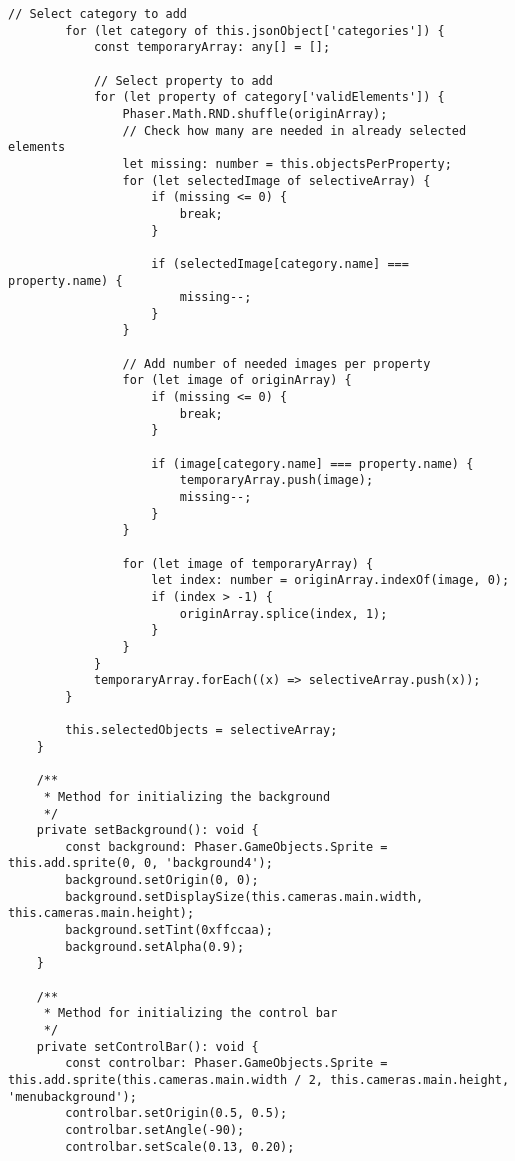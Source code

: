 \begin{lstlisting}[style=TypeScript, caption={sortingScene.ts}]
        // Select category to add
        for (let category of this.jsonObject['categories']) {
            const temporaryArray: any[] = [];

            // Select property to add
            for (let property of category['validElements']) {
                Phaser.Math.RND.shuffle(originArray);
                // Check how many are needed in already selected elements
                let missing: number = this.objectsPerProperty;
                for (let selectedImage of selectiveArray) {
                    if (missing <= 0) {
                        break;
                    }

                    if (selectedImage[category.name] === property.name) {
                        missing--;
                    }
                }

                // Add number of needed images per property
                for (let image of originArray) {
                    if (missing <= 0) {
                        break;
                    }

                    if (image[category.name] === property.name) {
                        temporaryArray.push(image);
                        missing--;
                    }
                }

                for (let image of temporaryArray) {
                    let index: number = originArray.indexOf(image, 0);
                    if (index > -1) {
                        originArray.splice(index, 1);
                    }
                }
            }
            temporaryArray.forEach((x) => selectiveArray.push(x));
        }

        this.selectedObjects = selectiveArray;
    }

    /**
     * Method for initializing the background
     */
    private setBackground(): void {
        const background: Phaser.GameObjects.Sprite = this.add.sprite(0, 0, 'background4');
        background.setOrigin(0, 0);
        background.setDisplaySize(this.cameras.main.width, this.cameras.main.height);
        background.setTint(0xffccaa);
        background.setAlpha(0.9);
    }

    /**
     * Method for initializing the control bar
     */
    private setControlBar(): void {
        const controlbar: Phaser.GameObjects.Sprite = this.add.sprite(this.cameras.main.width / 2, this.cameras.main.height, 'menubackground');
        controlbar.setOrigin(0.5, 0.5);
        controlbar.setAngle(-90);
        controlbar.setScale(0.13, 0.20);


\end{lstlisting}
